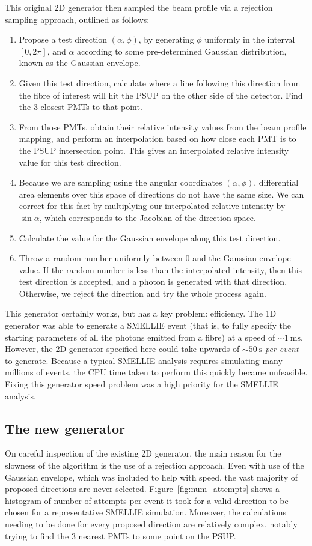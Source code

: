 This original 2D generator then sampled the beam profile via a rejection sampling approach, outlined as follows:
\begin{enumerate}
    \item Propose a test direction $(\alpha, \phi)$, by generating $\phi$ uniformly in the interval $[0, 2\pi]$, and $\alpha$ according to some pre-determined Gaussian distribution, known as the Gaussian envelope.
    \item Given this test direction, calculate where a line following this direction from the fibre of interest will hit the PSUP on the other side of the detector. Find the 3 closest PMTs to that point.
    \item From those PMTs, obtain their relative intensity values from the beam profile mapping, and perform an interpolation based on how close each PMT is to the PSUP intersection point. This gives an interpolated relative intensity value for this test direction.
    \item Because we are sampling using the angular coordinates $(\alpha, \phi)$, differential area elements over this space of directions do not have the same size. We can correct for this fact by multiplying our interpolated relative intensity by $\sin{\alpha}$, which corresponds to the Jacobian of the direction-space.
    \item Calculate the value for the Gaussian envelope along this test direction.
    \item Throw a random number uniformly between 0 and the Gaussian envelope value. If the random number is less than the interpolated intensity, then this test direction is accepted, and a photon is generated with that direction. Otherwise, we reject the direction and try the whole process again.
\end{enumerate}

This generator certainly works, but has a key problem: efficiency. The 1D generator was able to generate a SMELLIE event (that is, to fully specify the starting parameters of all the photons emitted from a fibre) at a speed of $\sim\SI{1}{\milli\second}$. However, the 2D generator specified here could take upwards of $\sim\SI{50}{\second}$ \textit{per event} to generate. Because a typical SMELLIE analysis requires simulating many millions of events, the CPU time taken to perform this quickly became unfeasible. Fixing this generator speed problem was a high priority for the SMELLIE analysis.

\subsection{The new generator}\label{sect:new_gen}
On careful inspection of the existing 2D generator, the main reason for the slowness of the algorithm is the use of a rejection approach. Even with use of the Gaussian envelope, which was included to help with speed, the vast majority of proposed directions are never selected. Figure~\ref{fig:num_attempts} shows a histogram of number of attempts per event it took for a valid direction to be chosen for a representative SMELLIE simulation. Moreover, the calculations needing to be done for every proposed direction are relatively complex, notably trying to find the 3 nearest PMTs to some point on the PSUP.

